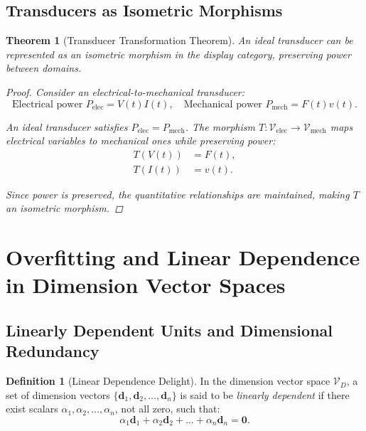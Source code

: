 \documentclass{article}
\newtheorem{theorem}{Theorem}[section]
\theoremstyle{definition}
\newtheorem{definition}{Definition}[section]
\theoremstyle{remark}
\begin{document}
	\subsection{Transducers as Isometric Morphisms}
	
	\begin{theorem}[Transducer Transformation Theorem]
		An ideal transducer can be represented as an isometric morphism in the display category, preserving power between domains.
		
		\begin{proof}
			Consider an electrical-to-mechanical transducer:
			\[
			\text{Electrical power } P_{\text{elec}} = V(t) I(t), \quad \text{Mechanical power } P_{\text{mech}} = F(t) v(t).
			\]
			
			An ideal transducer satisfies $P_{\text{elec}} = P_{\text{mech}}$. The morphism $T: \mathcal{V}_{\text{elec}} \rightarrow \mathcal{V}_{\text{mech}}$ maps electrical variables to mechanical ones while preserving power:
			\begin{align*}
				T(V(t)) &= F(t), \\
				T(I(t)) &= v(t).
			\end{align*}
			
			Since power is preserved, the quantitative relationships are maintained, making $T$ an isometric morphism.
		\end{proof}
	\end{theorem}
	
	\section{Overfitting and Linear Dependence in Dimension Vector Spaces}
	
	\subsection{Linearly Dependent Units and Dimensional Redundancy}
	
	\begin{definition}[Linear Dependence Delight]
		In the dimension vector space $\mathcal{V}_D$, a set of dimension vectors $\{ \mathbf{d}_1, \mathbf{d}_2, \dots, \mathbf{d}_n \}$ is said to be \emph{linearly dependent} if there exist scalars $\alpha_1, \alpha_2, \dots, \alpha_n$, not all zero, such that:
		\[
		\alpha_1 \mathbf{d}_1 + \alpha_2 \mathbf{d}_2 + \dots + \alpha_n \mathbf{d}_n = \mathbf{0}.
		\]
	\end{definition}
	
\end{document}
